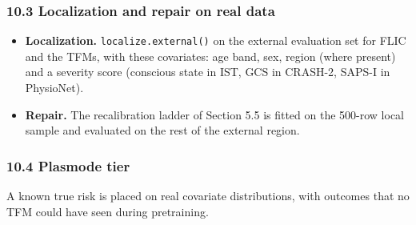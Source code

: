 \documentclass[
  10pt,
]{article}
\providecommand{\tightlist}{%
  \setlength{\itemsep}{0pt}\setlength{\parskip}{0pt}}
\begin{document}
\subsubsection{10.3 Localization and repair on real
data}\label{localization-and-repair-on-real-data}

\begin{itemize}
\tightlist
\item
  \textbf{Localization.} \texttt{localize.external()} on the
  external evaluation set for FLIC and the TFMs, with these
  covariates: age band, sex, region (where present) and a
  severity score (conscious state in IST, GCS in CRASH-2,
  SAPS-I in PhysioNet).
\item
  \textbf{Repair.} The recalibration ladder of Section 5.5
  is fitted on the 500-row local sample and evaluated on the
  rest of the external region.
\end{itemize}

\subsubsection{10.4 Plasmode tier}\label{plasmode-tier}

A known true risk is placed on real covariate distributions,
with outcomes that no TFM could have seen during
pretraining.
\end{document}
